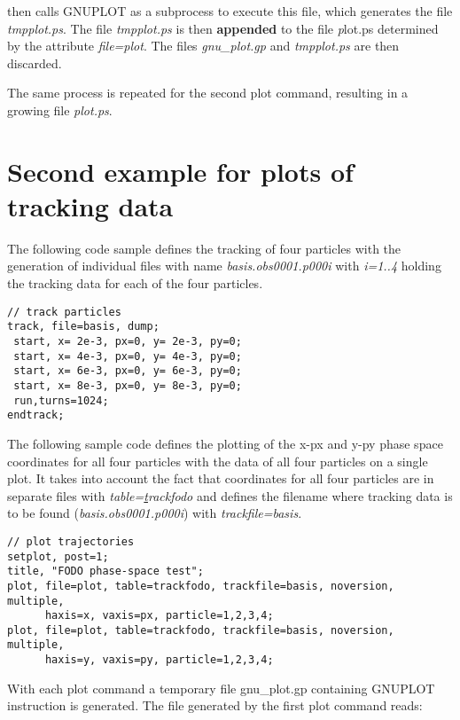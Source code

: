 \madx then calls GNUPLOT as a subprocess to execute this file, which
generates the file \textit{tmpplot.ps}.  
The file \textit{tmpplot.ps} is then \textbf{appended} to the file 
{\textit plot.ps} determined by the attribute \textit{file=plot}.  
The files \textit{gnu\_plot.gp} and \textit{tmpplot.ps} are then
discarded. 

The same process is repeated for the second plot command, resulting in a
growing file \textit{plot.ps}.


\section{Second example for plots of tracking data}
\label{sec:plot_example_2}

The following \madx code sample defines the tracking of four particles 
with the generation of individual files with name
\textit{basis.obs0001.p000i} with \textit{i=1..4}  
holding the tracking data for each of the four particles.  

\madhline
\begin{verbatim}
// track particles
track, file=basis, dump;
 start, x= 2e-3, px=0, y= 2e-3, py=0;
 start, x= 4e-3, px=0, y= 4e-3, py=0;
 start, x= 6e-3, px=0, y= 6e-3, py=0;
 start, x= 8e-3, px=0, y= 8e-3, py=0;
 run,turns=1024;
endtrack;
\end{verbatim}
\madhline

The following sample code defines the plotting of the x-px and y-py
phase space coordinates for all four particles with the data of all four
particles on a single plot.  
It takes into account the fact that coordinates for all four particles
are in separate files with 
\textit{table={\underline track}fodo} and defines the filename where tracking
data is to be found (\textit{basis.obs0001.p000i}) with
\textit{trackfile=basis}.  

\madhline
\begin{verbatim}
// plot trajectories
setplot, post=1; 
title, "FODO phase-space test";
plot, file=plot, table=trackfodo, trackfile=basis, noversion, multiple, 
      haxis=x, vaxis=px, particle=1,2,3,4; 
plot, file=plot, table=trackfodo, trackfile=basis, noversion, multiple, 
      haxis=y, vaxis=py, particle=1,2,3,4;  
\end{verbatim}
\madhline

With each plot command a temporary file gnu\_plot.gp containing GNUPLOT instruction is generated. 
The file generated by the first plot command reads: 

